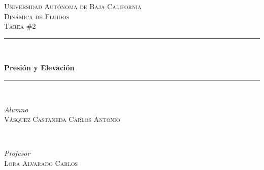 \documentclass[12pt, letterpaper]{article}
\begin{document}

\begin{titlepage} %
	\vspace*{-3cm}
	\hspace*{-2.5cm}
	\newcommand{\HRule}{\rule{\linewidth}{0.5mm}} %
	\center %
	
	
	\textsc{\LARGE Universidad Autónoma de Baja California}\\[1.5cm] %
	
	\textsc{\Large Dinámica de Fluidos}\\[0.5cm] %
	
	\textsc{\large Tarea \#2}\\[0.5cm] %
	
	
	\HRule\\[0.4cm]
	
	{\huge\bfseries Presión y Elevación\\[0.4cm] %
	
	\HRule\\[1.5cm]
	
	
	\begin{minipage}{0.4\textwidth}
		\begin{flushleft}
			\large
			\textit{Alumno}\\
			\textsc{Vásquez Castañeda Carlos Antonio} %
		\end{flushleft}
	\end{minipage}
	~
	\begin{minipage}{0.4\textwidth}
		\begin{flushright}
			\large
			\textit{Profesor}\\
			\textsc{Lora Alvarado Carlos} %
		\end{flushright}
	\end{minipage}
	
}
\end{titlepage}
\end{document}
